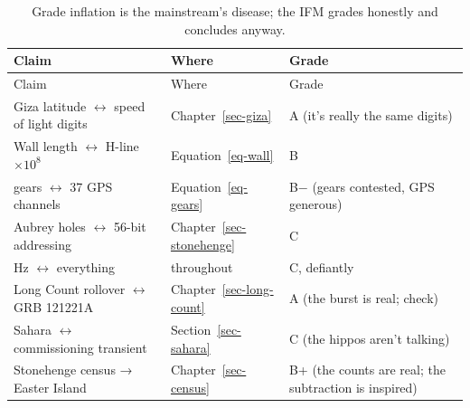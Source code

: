 \documentclass[
  english,
  11pt,
  letterpaper,
]{scrbook}
\begin{document}
\begin{longtable}[]{@{}
  >{\raggedright\arraybackslash}p{}
  >{\raggedright\arraybackslash}p{}
  >{\centering\arraybackslash}p{}@{}}
\caption{Grade inflation is the mainstream's disease; the IFM grades
honestly and concludes anyway.}\label{tbl-grades}\tabularnewline
\toprule\noalign{}
\begin{minipage}[b]{\linewidth}\raggedright
Claim
\end{minipage} & \begin{minipage}[b]{\linewidth}\raggedright
Where
\end{minipage} & \begin{minipage}[b]{\linewidth}\centering
Grade
\end{minipage} \\
\midrule\noalign{}
\endfirsthead
\toprule\noalign{}
\begin{minipage}[b]{\linewidth}\raggedright
Claim
\end{minipage} & \begin{minipage}[b]{\linewidth}\raggedright
Where
\end{minipage} & \begin{minipage}[b]{\linewidth}\centering
Grade
\end{minipage} \\
\midrule\noalign{}
\endhead
\bottomrule\noalign{}
\endlastfoot
Giza latitude \(\leftrightarrow\) speed of light digits &
Chapter~\ref{sec-giza} & A (it's really the same digits) \\
Wall length \(\leftrightarrow\) H-line \(\times10^{8}\) &
Equation~\ref{eq-wall} & B \\
37 gears \(\leftrightarrow\) 37 GPS channels & Equation~\ref{eq-gears} &
B− (gears contested, GPS generous) \\
Aubrey holes \(\leftrightarrow\) 56-bit addressing &
Chapter~\ref{sec-stonehenge} & C \\
432 Hz \(\leftrightarrow\) everything & throughout & C, defiantly \\
Long Count rollover \(\leftrightarrow\) GRB 121221A &
Chapter~\ref{sec-long-count} & A (the burst is real; check) \\
Sahara \(\leftrightarrow\) commissioning transient &
Section~\ref{sec-sahara} & C (the hippos aren't talking) \\
Stonehenge census → Easter Island & Chapter~\ref{sec-census} & B+ (the
counts are real; the subtraction is inspired) \\

\end{longtable}
\end{document}
